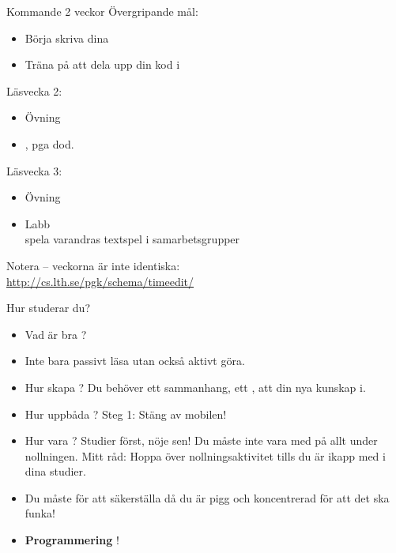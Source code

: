\begin{SlideExtra}{Kommande 2 veckor}
Övergripande mål:
\begin{itemize}
\item Börja skriva dina 
\item Träna på att dela upp din kod i 
\end{itemize}

Läsvecka 2:
\begin{itemize}
\item Övning \texttt{\ExeWeekTWO}
\item {} , pga dod.
\end{itemize}
Läsvecka 3:
\begin{itemize}
\item Övning \texttt{\ExeWeekTHREE}
\item Labb \texttt{\LabWeekTHREE}  \\ spela varandras textspel i samarbetsgrupper
\end{itemize}

\vspace{1em} Notera  -- veckorna är inte identiska:\\\url{http://cs.lth.se/pgk/schema/timeedit/}

\end{SlideExtra}




\begin{SlideExtra}{Hur studerar du?}
\begin{itemize}
\item Vad är bra ?
\item {} Inte bara passivt läsa utan också aktivt göra.
\item Hur skapa ?
Du behöver ett sammanhang, ett , att  din nya kunskap i.
\item Hur uppbåda ? Steg 1: Stäng av mobilen!
\item Hur vara ? Studier först, nöje sen! Du måste inte vara med på allt under nollningen. Mitt råd: Hoppa över nollningsaktivitet tills du är ikapp med i dina studier.
\item Du måste  för att säkerställa  då du är pigg och koncentrerad för att det ska funka!
\item \textbf{Programmering}  !
\end{itemize}
\end{SlideExtra}


